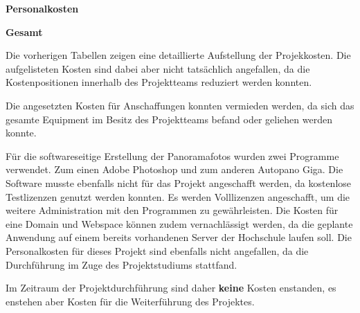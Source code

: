 \textbf{Personalkosten}



\textbf{Gesamt}


Die vorherigen Tabellen zeigen eine detaillierte Aufstellung der Projekkosten.
Die aufgelisteten Kosten sind dabei aber nicht tatsächlich angefallen, da die
Kostenpositionen innerhalb des Projektteams reduziert werden konnten.

Die angesetzten Kosten für Anschaffungen konnten vermieden werden, 
da sich das gesamte Equipment im Besitz des Projektteams befand oder 
geliehen werden konnte.

Für die softwareseitige Erstellung der Panoramafotos wurden
zwei Programme verwendet. Zum einen Adobe Photoshop und zum anderen Autopano Giga. 
Die Software musste ebenfalls nicht für das Projekt angeschafft werden, da kostenlose
Testlizenzen genutzt werden konnten. Es 
werden Volllizenzen angeschafft, um die weitere Administration mit den Programmen zu gewährleisten.
Die Kosten für eine Domain und Webspace können zudem vernachlässigt werden, da die geplante Anwendung auf einem bereits 
vorhandenen Server der Hochschule laufen soll.
Die Personalkosten für dieses Projekt sind ebenfalls nicht angefallen, da die Durchführung im Zuge des Projektstudiums 
stattfand.

Im Zeitraum der Projektdurchführung sind daher \textbf{keine} Kosten enstanden, es enstehen aber
Kosten für die Weiterführung des Projektes.
